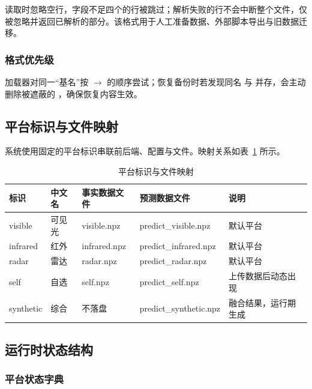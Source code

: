 读取时忽略空行，字段不足四个的行被跳过；解析失败的行不会中断整个文件，仅被忽略并返回已解析的部分。该格式用于人工准备数据、外部脚本导出与旧数据迁移。

\subsubsection{格式优先级}

加载器对同一“基名”按  $\rightarrow$  的顺序尝试；恢复备份时若发现同名  与  并存，会主动删除被遮蔽的 ，确保恢复内容生效。

\subsection{平台标识与文件映射}

系统使用固定的平台标识串联前后端、配置与文件。映射关系如表~\ref{tab:platform} 所示。

\begin{table}[H]
\centering
\caption{平台标识与文件映射}
\label{tab:platform}
\small
\begin{tabularx}{\linewidth}{@{}>{\ttfamily\scriptsize}p{1.9cm}>{\scriptsize}p{1.7cm}>{\raggedright\ttfamily\scriptsize}p{3.4cm}>{\raggedright\ttfamily\scriptsize}p{3.1cm}>{\raggedright\arraybackslash}X@{}}
\toprule
标识 & 中文名 & 事实数据文件 & 预测数据文件 & 说明 \\
\midrule
visible & 可见光 & visible.npz & predict\_visible.npz & 默认平台 \\
infrared & 红外 & infrared.npz & predict\_infrared.npz & 默认平台 \\
radar & 雷达 & radar.npz & predict\_radar.npz & 默认平台 \\
self & 自选 & self.npz & predict\_self.npz & 上传数据后动态出现 \\
synthetic & 综合 & 不落盘 & predict\_synthetic.npz & 融合结果，运行期生成 \\
\bottomrule
\end{tabularx}
\end{table}

\subsection{运行时状态结构}

\subsubsection{平台状态字典}

